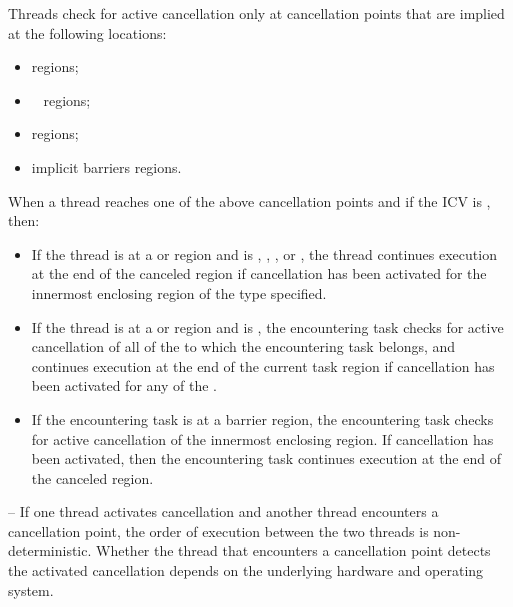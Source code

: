 {{{{\begin{samepage}
\end{samepage}

Threads check for active cancellation only at cancellation points that are 
implied at the following locations:

\begin{itemize}
\item {} regions;
\item {}~ regions;
\item {} regions;
\item implicit barriers regions.
\end{itemize}

When a thread reaches one of the above cancellation points and if the  ICV is ,  then:
\begin{itemize}
\item If the thread is at a  or  region 
and  is , , , or 
, the thread continues execution at the end of the canceled 
region if cancellation has been activated for the innermost enclosing region 
of the type specified.

\item If the thread is at a  or  region 
and  is , the encountering task 
checks for active cancellation of all of the  to which the 
encountering task belongs, and continues execution at the end of the current 
task region if cancellation has been activated for any of the .

\item If the encountering task is at a barrier region, the encountering task 
checks for active cancellation of the innermost enclosing  
region. If cancellation has been activated, then the encountering task 
continues execution at the end of the canceled region.
\end{itemize}

\notestart
\noteheader – If one thread activates cancellation and another thread encounters a cancellation 
point, the order of execution between the two threads is non-deterministic. 
Whether the thread that encounters a cancellation point detects the activated cancellation 
depends on the underlying hardware and operating system.
\noteend

}}}}
